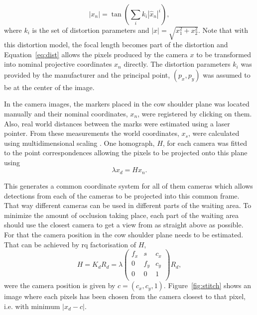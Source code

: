 \documentclass{IET}
\begin{document}
\begin{equation}
	\left| x_n \right| = \tan \left( \sum_i k_i \left| \hat x_n \right|^i \right)
	\label{eq:dist} ,
\end{equation}
where $k_i$ is the set of distortion parameters and 
$\left| x \right| = \sqrt{x_1^2 + x_2^2}$.
Note that with this distortion model, the focal length becomes part of the distortion and Equation~\ref{eq:dist} allows the pixels produced by the camera $x$ to be transformed into nominal projective coordinates $x_n$ directly. The distortion parameters $k_i$ was provided by the manufacturer and the principal point, $\left(p_x, p_y\right)$  was assumed to be at the center of the image.

In the camera images, the markers placed in the cow shoulder plane was located manually and their nominal coordinates, $x_n$, were registered by clicking on them. Also, real world distances between the marks were estimated using a laser pointer. From these measurements the world coordinates, $x_s$, were calculated using multidimensional scaling \cite{Young1938}. One homograph, $H$, for each camera was fitted to the point correspondences allowing the pixels to be projected onto this plane using 
\begin{equation}
\lambda x_d = H x_n .
\end{equation}

This generates a common coordinate system for all of them cameras which allows detections from each of the cameras to be projected into this common frame. That way different cameras can be used in different parts of the waiting area. To minimize the amount of occlusion taking place, each part of the waiting area should use the closest camera to get a view from as straight above as possible. For that the camera position in the cow shoulder plane needs to be estimated. That can be achieved by rq factorisation of $H$, 
\begin{equation}
H = K_d R_d = 
    \lambda
	\left(
	\begin{array}{ccc}
		f_x & s & c_x  \\
		0 & f_y & c_y  \\
		0 & 0 & 1  \\
	\end{array}
	\right)
	R_d ,
\end{equation}
were the camera position is given by $c = \left(c_x, c_y, 1\right)$. Figure~\ref{fig:stitch} shows an image where each pixels has been chosen from the camera closest to that pixel, i.e. with  minimum $\left| x_d - c \right|$.
\end{document}
